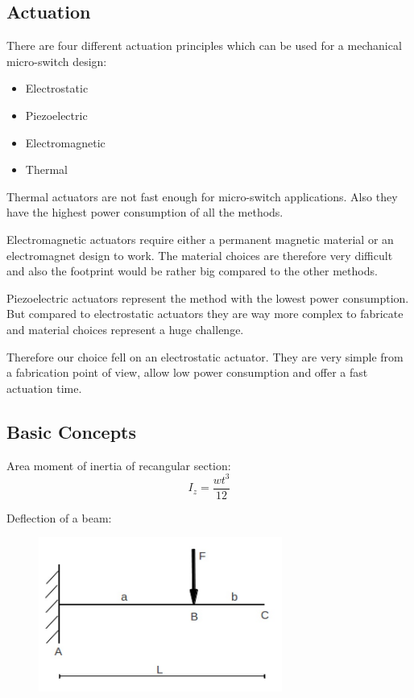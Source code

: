 \subsection{Actuation}
\label{sec:actuation}
There are four different actuation principles which can be used for a mechanical micro-switch design:
\begin{itemize}
  \item Electrostatic
  \item Piezoelectric
  \item Electromagnetic
  \item Thermal
\end{itemize}

Thermal actuators are not fast enough for micro-switch applications. 
Also they have the highest power consumption of all the methods.

Electromagnetic actuators require either a permanent magnetic material or an electromagnet design to work.
The material choices are therefore very difficult and also the footprint would be rather big compared to the other methods.

Piezoelectric actuators represent the method with the lowest power consumption.
But compared to electrostatic actuators they are way more complex to fabricate and material choices represent a huge challenge.\cite{klaasse2002piezoelectric}

Therefore our choice fell on an electrostatic actuator.
They are very simple from a fabrication point of view, allow low power consumption and offer a fast actuation time.

\subsection{Basic Concepts}
\label{sec:basic_concepts}


Area moment of inertia of recangular section:
\begin{equation}
	I_z = \frac{wt^3}{12}
	\label{eq:area_moment_of_inertia}
\end{equation}

Deflection of a beam:
\begin{figure}[h]
	\centering
	\includegraphics[width=8cm]{fig/cantilever_beam_single_load.png}
	\label{fig:cantilever_beam_single_load}
\end{figure}

